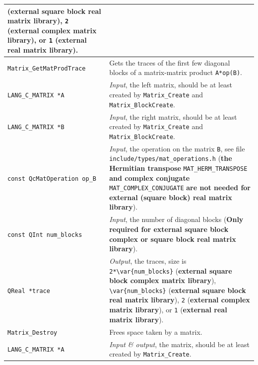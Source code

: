 \documentclass[a4paper,11pt,twoside,openright]{book}
\begin{document}
\begin{center}
\begin{longtable}{l|p{}}
        (\textbf{external square block real matrix library}), \verb|2| %
        (\textbf{external complex matrix library}), or \verb|1| %
        (\textbf{external real matrix library}).\\
    \hline
%
    \verb|Matrix_GetMatProdTrace|\index{\texttt{Matrix\_GetMatProdTrace}} %
      & Gets the traces of the first few diagonal blocks of a matrix-matrix
        product \verb|A*op(B)|.\\
    \hspace*{2ex}\verb|LANG_C_MATRIX *A| %
      & \textsl{Input}, the left matrix, should be at least created by
        \verb|Matrix_Create| and \verb|Matrix_BlockCreate|.\\
    \hspace*{2ex}\verb|LANG_C_MATRIX *B| %
      & \textsl{Input}, the right matrix, should be at least created by
        \verb|Matrix_Create| and \verb|Matrix_BlockCreate|.\\
    \hspace*{2ex}\verb|const QcMatOperation op_B| %
      & \textsl{Input}, the operation on the matrix \verb|B|, see file
        \verb|include/types/mat_operations.h| (\textbf{the Hermitian transpose}
        \verb|MAT_HERM_TRANSPOSE| \textbf{and complex conjugate}
        \verb|MAT_COMPLEX_CONJUGATE| \textbf{are not needed for external (square block)
        real matrix library}).\\
    \hspace*{2ex}\verb|const QInt num_blocks| %
      & \textsl{Input}, the number of diagonal blocks %
        (\textbf{Only required for external square block complex or
        square block real matrix library}).\\
    \hspace*{2ex}\verb|QReal *trace| %
      & \textsl{Output}, the traces, size is \verb|2*\var{num_blocks}| %
        (\textbf{external square block complex matrix library}), \verb|\var{num_blocks}| %
        (\textbf{external square block real matrix library}), \verb|2| %
        (\textbf{external complex matrix library}), or \verb|1| %
        (\textbf{external real matrix library}).\\
    \hline
%
    \verb|Matrix_Destroy|\index{\texttt{Matrix\_Destroy}} %
      & Frees space taken by a matrix.\\
    \hspace*{2ex}\verb|LANG_C_MATRIX *A| %
      & \textsl{Input \& output}, the matrix, should be at least created by
        \verb|Matrix_Create|.\\

\end{longtable}
\end{center}
\end{document}
